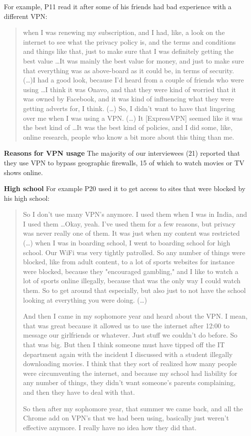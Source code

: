 For example, P11 read it after some of his friends had bad experience with a
different VPN: \begin{quote}when I was renewing my subscription, and I had,
like, a look on the internet to see what the privacy policy is, and the terms
and conditions and things like that, just to make sure that I was definitely
getting the best value \dots It was mainly the best value for money, and just
to make sure that everything was as above-board as it could be, in terms of
security. (\dots)I had a good look, because I'd heard from a couple of friends
who were using \dots I think it was Onavo, and that they were kind of worried
that it was owned by Facebook, and it was kind of influencing what they were
getting adverts for, I think. (\dots) So, I didn't want to have that lingering
over me when I was using a VPN. (\dots) It [ExpressVPN] seemed like it was the
best kind of \dots It was the best kind of policies, and I did some, like,
online research, people who know a bit more about this thing than
me.\end{quote}

\textbf{Reasons for VPN usage} The majority of our interviewees (21) reported
that they use VPN to bypass geographic firewalls, 15 of which to watch movies
or TV shows online.  

\textbf{High school} For example P20 used it to get access to sites that were
blocked by his high school: 
\begin{quote}So I don't use many VPN's anymore. I used them when I was in
    India, and I used them \dots Okay, yeah. I've used them for a few reasons,
    but privacy was never really one of them. It was just when my content was
    restricted (\dots) when I was in boarding school, I went to boarding
    school for high school. Our WiFi was very tightly patrolled. So any number
    of things were blocked, like from adult content, to a lot of sports
    websites for instance were blocked, because they "encouraged gambling,"
    and I like to watch a lot of sports online illegally, because that was the
    only way I could watch them. So to get around that especially, but also
    just to not have the school looking at everything you were doing. (\dots) 

And then I came in my sophomore year and heard about the VPN. I mean, that was
    great because it allowed us to use the internet after 12:00 to message our
    girlfriends or whatever. Just stuff we couldn't do before. So that was
    big. But then I think someone must have tipped off the IT department again
    with the incident I discussed with a student illegally downloading movies.
    I think that they sort of realized how many people were circumventing the
    internet, and because my school had liability for any number of things,
    they didn't want someone's parents complaining, and then they have to deal
    with that.


So then after my sophomore year, that summer we came back, and all the Chrome
add on VPN's that we had been using, basically just weren't effective anymore.
I really have no idea how they did that.\end{quote}


